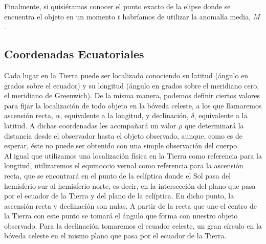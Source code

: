 Finalmente, si quisiéramos conocer el punto exacto de la elipse donde se encuentra el objeto en un momento $t$ habríamos de utilizar la anomalía media, $M$.\\


\subsection{Coordenadas Ecuatoriales}
\label{subsec:equatorial_coordinates}
Cada lugar en la Tierra puede ser localizado conociendo su latitud (ángulo en grados sobre el ecuador) y su longitud (ángulo en grados sobre el meridiano cero, el meridiano de Greenwich). De la misma manera, podemos definir ciertos valores para fijar la localización de todo objeto en la bóveda celeste, a los que llamaremos ascensión recta, $\alpha$, equivalente a la longitud, y declinación, $\delta$, equivalente a la latitud. A dichas coordenadas les acompañará un valor $\rho$ que determinará la distancia desde el observador hasta el objeto observado, aunque, como es de esperar, éste no puede ser obtenido con una simple observación del cuerpo.\\

Al igual que utilizamos una localización física en la Tierra como referencia para la longitud, utilizaremos el equinoccio vernal como referencia para la ascensión recta, que se encontrará en el punto de la eclíptica donde el Sol pasa del hemisferio sur al hemisferio norte, es decir, en la intersección del plano que pasa por el ecuador de la Tierra y del plano de la eclíptica. En dicho punto, la ascensión recta y declinación son nulas. A partir de la recta que une el centro de la Tierra con este punto se tomará el ángulo que forma con nuestro objeto observado. Para la declinación tomaremos el ecuador celeste, un gran círculo en la bóveda celeste en el mismo plano que pasa por el ecuador de la Tierra\cite{right_ascension_declination}.\\

